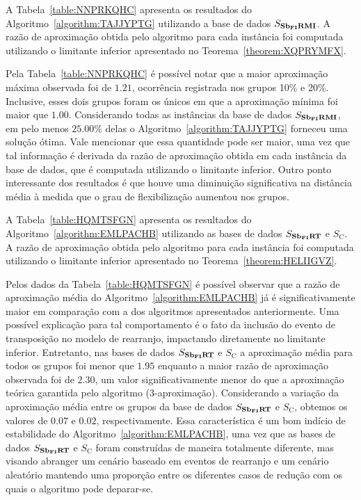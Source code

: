 A Tabela~\ref{table:NNPRKQHC} apresenta os resultados do Algoritmo~\ref{algorithm:TAJJYPTG} utilizando a base de dados $S_{\textbf{Sb\textsubscript{FI}RMI}}{}$. A razão de aproximação obtida pelo algoritmo para cada instância foi computada utilizando o limitante inferior apresentado no Teorema~\ref{theorem:XQPRYMFX}.



Pela Tabela~\ref{table:NNPRKQHC} é possível notar que a maior aproximação máxima observada foi de $1.21$, ocorrência registrada nos grupos 10\% e 20\%. Inclusive, esses dois grupos foram os únicos em que a aproximação mínima foi maior que $1.00$. Considerando todas as instâncias da base de dados $S_{\textbf{Sb\textsubscript{FI}RMI}}{}$, em pelo menos $25.00$\% delas o Algoritmo~\ref{algorithm:TAJJYPTG} forneceu uma solução ótima. Vale mencionar que essa quantidade pode ser maior, uma vez que tal informação é derivada da razão de aproximação obtida em cada instância da base de dados, que é computada utilizando o limitante inferior. Outro ponto interessante dos resultados é que houve uma diminuição significativa na distância média à medida que o grau de flexibilização aumentou nos grupos.

A Tabela~\ref{table:HQMTSFGN} apresenta os resultados do Algoritmo~\ref{algorithm:EMLPACHB} utilizando as bases de dados $S_{\textbf{Sb\textsubscript{FI}RT}}{}$ e $S_{\text{C}}$. A razão de aproximação obtida pelo algoritmo para cada instância foi computada utilizando o limitante inferior apresentado no Teorema~\ref{theorem:HELIIGVZ}.



Pelos dados da Tabela~\ref{table:HQMTSFGN} é possível observar que a razão de aproximação média do Algoritmo~\ref{algorithm:EMLPACHB} já é significativamente maior em comparação com a dos algoritmos apresentados anteriormente. Uma possível explicação para tal comportamento é o fato da inclusão do evento de transposição no modelo de rearranjo, impactando diretamente no limitante inferior. Entretanto, nas bases de dados $S_{\textbf{Sb\textsubscript{FI}RT}}{}$ e $S_{\text{C}}$ a aproximação média para todos os grupos foi menor que $1.95$ enquanto a maior razão de aproximação observada foi de $2.30$, um valor significativamente menor do que a aproximação teórica garantida pelo algoritmo ($3$-aproximação). Considerando a variação da aproximação média entre os grupos da base de dados $S_{\textbf{Sb\textsubscript{FI}RT}}{}$ e $S_{\text{C}}$, obtemos os valores de $0.07$ e $0.02$, respectivamente. Essa característica é um bom indício de estabilidade do Algoritmo~\ref{algorithm:EMLPACHB}, uma vez que as bases de dados $S_{\textbf{Sb\textsubscript{FI}RT}}{}$ e $S_{\text{C}}$ foram construídas de maneira totalmente diferente, mas visando abranger um cenário baseado em eventos de rearranjo e um cenário aleatório mantendo uma proporção entre os diferentes casos de redução com os quais o algoritmo pode deparar-se.

